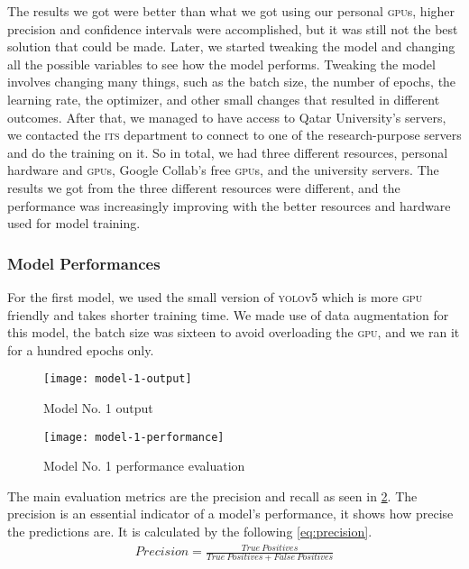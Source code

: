 \documentclass[../main.tex]{subfiles}
\begin{document}
The results we got were better than what we got using our personal 
\textsc{gpu}s, higher precision and confidence intervals were 
accomplished, but it was still not the best solution that could be made. 
Later, we started tweaking the model and changing all the possible 
variables to see how the model performs. Tweaking the model involves 
changing many things, such as the batch size, the number of epochs, the 
learning rate, the optimizer, and other small changes that resulted in 
different outcomes. 
After that, we managed to have access to Qatar University's servers, we 
contacted the \textsc{its} department to connect to one of the 
research-purpose servers and do the training on it. So in total, we had 
three different resources, personal hardware and \textsc{gpu}s, Google 
Collab's free \textsc{gpu}s, and the university servers. The results we 
got from the three different resources were different, and the 
performance was increasingly improving with the better resources and 
hardware used for model training. 


\subsubsection{Model Performances}

For the first model, we used the small version of \textsc{yolo}v5 which is 
more \textsc{gpu} friendly and takes shorter training time.
We made use of data augmentation for this model, the batch size was 
sixteen to avoid overloading the \textsc{gpu}, and we ran it for a 
hundred epochs only.

\begin{figure}[tbp] 
	\centering
	\texttt{[image: model-1-output]} 
	\caption{Model No. 1 output} \label{fig:model-1-output} 
\end{figure}

\begin{figure}[tbp] 
	\centering
	\texttt{[image: model-1-performance]} 
	\caption{Model No. 1 performance evaluation} \label{fig:model-1-performance} 
\end{figure}

The main evaluation metrics are the precision and recall
as seen in \cref{fig:model-1-performance}.
The precision is an essential indicator of a model's performance, it shows 
how precise the predictions are. 
It is calculated by the following \cref{eq:precision}. 
%
\begin{align}
    Precision =  \frac{True\ Positives}{True\ Positives + False\ Positives} \label{eq:precision}
\end{align}
\end{document}
